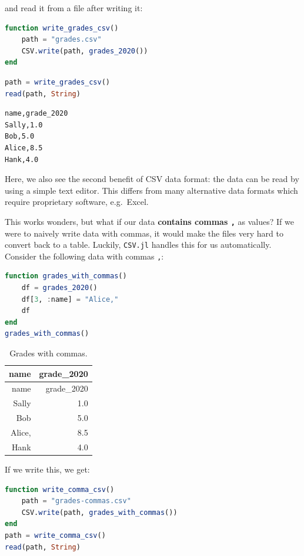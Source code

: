 \documentclass[
  notoc %
]{tufte-book}
\newcommand{\passthrough}[1]{#1}
\begin{document}
and read it from a file after writing it:

\begin{lstlisting}[language=Julia]
function write_grades_csv()
    path = "grades.csv"
    CSV.write(path, grades_2020())
end
\end{lstlisting}

\begin{lstlisting}[language=Julia]
path = write_grades_csv()
read(path, String)
\end{lstlisting}

\begin{lstlisting}[language=Output]
name,grade_2020
Sally,1.0
Bob,5.0
Alice,8.5
Hank,4.0

\end{lstlisting}

Here, we also see the second benefit of CSV data format: the data can be
read by using a simple text editor. This differs from many alternative
data formats which require proprietary software, e.g.~Excel.

This works wonders, but what if our data \textbf{contains commas
\passthrough{\lstinline!,!}} as values? If we were to naively write data
with commas, it would make the files very hard to convert back to a
table. Luckily, \passthrough{\lstinline!CSV.jl!} handles this for us
automatically. Consider the following data with commas
\passthrough{\lstinline!,!}:

\begin{lstlisting}[language=Julia]
function grades_with_commas()
    df = grades_2020()
    df[3, :name] = "Alice,"
    df
end
grades_with_commas()
\end{lstlisting}

\hypertarget{tbl:grades_with_commas}{}
\begin{longtable}[]{@{}rr@{}}
\caption{\label{tbl:grades_with_commas}Grades with
commas.}\tabularnewline
\toprule
name & grade\_2020 \\
\midrule
\endfirsthead
\toprule
name & grade\_2020 \\
\midrule
\endhead
Sally & 1.0 \\
Bob & 5.0 \\
Alice, & 8.5 \\
Hank & 4.0 \\
\bottomrule
\end{longtable}

If we write this, we get:

\begin{lstlisting}[language=Julia]
function write_comma_csv()
    path = "grades-commas.csv"
    CSV.write(path, grades_with_commas())
end
path = write_comma_csv()
read(path, String)
\end{lstlisting}
\end{document}

